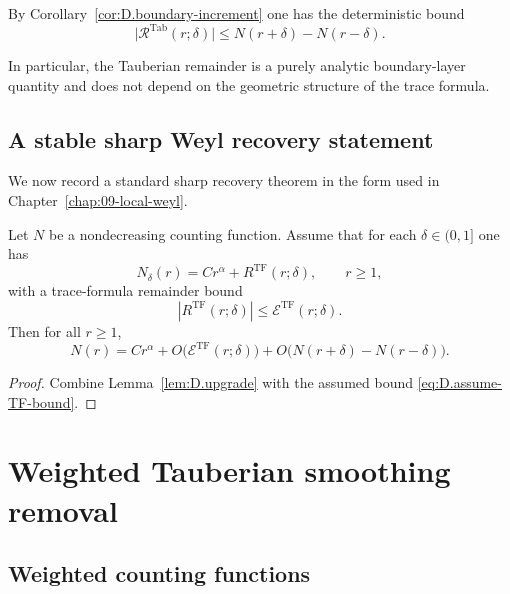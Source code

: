 By Corollary~\ref{cor:D.boundary-increment} one has the deterministic bound
\begin{equation}
\label{eq:D.tab-bound}
\bigl|\mathcal{R}^{\mathrm{Tab}}(r;\delta)\bigr|
\le
N(r+\delta)-N(r-\delta).
\end{equation}

In particular, the Tauberian remainder is a purely analytic boundary-layer quantity and does not depend on the
geometric structure of the trace formula.

\subsection{A stable sharp Weyl recovery statement}
\label{subsec:D.sharp-weyl-recovery}

We now record a standard sharp recovery theorem in the form used in Chapter~\ref{chap:09-local-weyl}.

\begin{theorem}
\label{thm:D.sharp-from-smoothed}
Let $N$ be a nondecreasing counting function.
Assume that for each $\delta\in(0,1]$ one has
\begin{equation}
\label{eq:D.assume-smoothed}
N_\delta(r)
=
C r^\alpha
+
R^{\mathrm{TF}}(r;\delta),
\qquad r\ge 1,
\end{equation}
with a trace-formula remainder bound
\begin{equation}
\label{eq:D.assume-TF-bound}
|R^{\mathrm{TF}}(r;\delta)|
\le
\mathcal{E}^{\mathrm{TF}}(r;\delta).
\end{equation}
Then for all $r\ge 1$,
\begin{equation}
\label{eq:D.sharp-final}
N(r)
=
C r^\alpha
+
O\!\bigl(\mathcal{E}^{\mathrm{TF}}(r;\delta)\bigr)
+
O\!\bigl(N(r+\delta)-N(r-\delta)\bigr).
\end{equation}
\end{theorem}

\begin{proof}
Combine Lemma~\ref{lem:D.upgrade} with the assumed bound \eqref{eq:D.assume-TF-bound}.
\end{proof}

\section{Weighted Tauberian smoothing removal}
\label{sec:D.weighted}

\subsection{Weighted counting functions}
\label{subsec:D.weighted-count}

